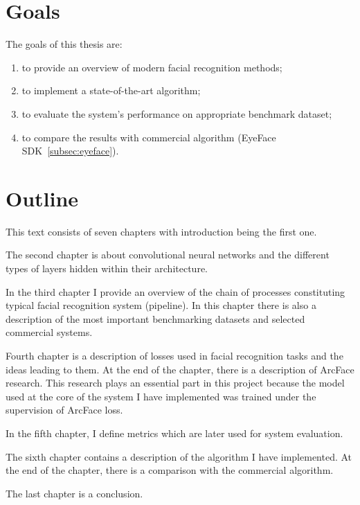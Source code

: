 \section{Goals}\label{sec:goals}
The goals of this thesis are:
\begin{enumerate}
    \item to provide an overview of modern facial recognition methods;
    \item to implement a state-of-the-art algorithm;
    \item to evaluate the system's performance on appropriate benchmark dataset;
    \item to compare the results with commercial algorithm (EyeFace SDK~\ref{subsec:eyeface}).
\end{enumerate}

\section{Outline}\label{sec:outline}
This text consists of seven chapters with introduction being the first one.

The second chapter is about convolutional neural networks and the different types of layers hidden within their
architecture.

In the third chapter I provide an overview of the chain of processes constituting typical facial recognition system
(pipeline).
In this chapter there is also a description of the most important benchmarking datasets and selected commercial
systems.

Fourth chapter is a description of losses used in facial recognition tasks and the ideas leading to them.
At the end of the chapter, there is a description of ArcFace research.
This research plays an essential part in this project because the model used at the core of the system I have
implemented was trained under the supervision of ArcFace loss.

In the fifth chapter, I define metrics which are later used for system evaluation.

The sixth chapter contains a description of the algorithm I have implemented.
At the end of the chapter, there is a comparison with the commercial algorithm.

The last chapter is a conclusion.